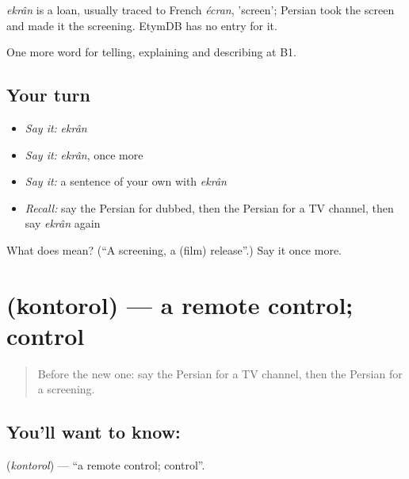 \begin{cousinweb}
\emph{ekrân} is a loan, usually traced to French \emph{écran}, 'screen'; Persian took the screen and made it the screening. EtymDB has no entry for it.
\end{cousinweb}

\begin{grammarlens}[title={What you've built}]
One more word for telling, explaining and describing at B1.
\end{grammarlens}

\subsection*{Your turn}
\begin{itemize}
\raggedright
  \item \emph{Say it:} \emph{ekrân}
  \item \emph{Say it:} \emph{ekrân}, once more
  \item \emph{Say it:} a sentence of your own with \emph{ekrân}
  \item \emph{Recall:} say the Persian for dubbed, then the Persian for a TV channel, then say \emph{ekrân} again
\end{itemize}

\begin{tcolorbox}[breakable,colback=teal!4,colframe=teal!35!black,title={Before you move on}]
What does  mean? (\textquotedblleft{}A screening, a (film) release\textquotedblright{}.) Say it once more.
\end{tcolorbox}
\section[\texorpdfstring{\fa{کنترل} (kontorol)}{کنترل (kontorol)}]{ (kontorol) — a remote control; control}

\label{lesson:FA-C532-kontorol}



\begin{quote}
Before the new one: say the Persian for a TV channel, then the Persian for a screening.
\end{quote}

\subsection*{You'll want to know: }
\textbf{} (\emph{kontorol}) — \textquotedblleft{}a remote control; control\textquotedblright{}.

